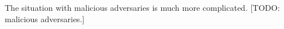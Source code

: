 The situation with malicious adversaries is much more complicated. [TODO:
malicious adversaries.]




